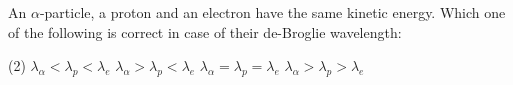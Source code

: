 \item An $\alpha$-particle, a proton and an electron have the same kinetic energy. Which one of the following is correct in case of their de-Broglie wavelength:
\begin{tasks}(2)
    \task $\lambda_{\alpha} < \lambda_p < \lambda_e$
    \task $\lambda_{\alpha} > \lambda_p < \lambda_e$
    \task $\lambda_{\alpha} = \lambda_p = \lambda_e$
    \task $\lambda_{\alpha} > \lambda_p > \lambda_e$
\end{tasks}